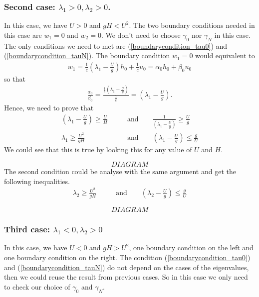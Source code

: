\documentclass{article}
\theoremstyle{definition}
\begin{document}
    \subsubsection{Second case: $\lambda_1 >0, \lambda_2>0$.}
        In this case, we have $U>0$ and $gH < U^2$. The two boundary conditions needed in this case 
        are $w_1 = 0$ and $w_2 = 0$. We don't need to choose $\gamma_0$ nor $\gamma_N$ in this case. 
        The only conditions we need to met are 
        (\ref{boundarycondition_tau0}) and (\ref{boundarycondition_tauN}). The boundary condition 
        $w_1 = 0$ would equivalent to 
        \begin{align}
            w_1 = \frac{1}{c}\left(\lambda_1 -\frac{ U}{g}\right) h_0 + \frac{1}{c} u_0 = \alpha_0 h_0 + \beta_0 u_0
        \end{align}
        so that 
        \begin{align}
            \frac{\alpha_0}{\beta_0} 
            = \frac{\frac{1}{c}\left(\lambda_1 -\frac{ U}{g}\right)}{\frac{1}{c}} 
            = \left(\lambda_1 -\frac{ U}{g}\right).
        \end{align}
        Hence, we need to prove that 
        \begin{align}
            \left(\lambda_1 -\frac{ U}{g}\right) \geq \frac{U}{H} 
            &\qquad \text{and} \qquad
            \frac{1}{\left(\lambda_1 -\frac{ U}{g}\right)} \geq \frac{U}{g} \\
            \lambda_1 \geq \frac{U^2}{gH} 
            &\qquad \text{and} \qquad
            \left(\lambda_1 -\frac{ U}{g}\right) \leq \frac{g}{U} 
        \end{align}
        We could see that this is true by looking this for any value of $U$ and $H$. 

        \[ DIAGRAM \]
        The second condition could be analyse with the same argument and get the following inequalities.
        \begin{align}
            \lambda_2 \geq \frac{U^2}{gH} 
            &\qquad \text{and} \qquad
            \left(\lambda_2 -\frac{ U}{g}\right) \leq \frac{g}{U} 
        \end{align}

        \[ DIAGRAM \]

    \subsubsection{Third case: $\lambda_1 <0, \lambda_2 >0$}
    In this case, we have $U<0$ and $gH > U^2$, one boundary condition on the left 
    and one boundary condition on the right. The condition (\ref{boundarycondition_tau0}) and (\ref{boundarycondition_tauN})
    do not depend on the cases of the eigenvalues, then we could reuse the result 
    from previous cases. So in this case we only need to check our choice 
    of $\gamma_0$ and $\gamma_N$. 
\end{document}
